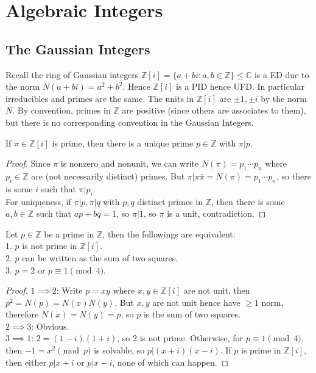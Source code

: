 \section{Algebraic Integers}
\subsection{The Gaussian Integers}
Recall the ring of Gaussian integers $\mathbb Z[i]=\{a+bi:a,b\in\mathbb Z\}\le\mathbb C$ is a ED due to the norm $N(a+bi)=a^2+b^2$.
Hence $\mathbb Z[i]$ is a PID hence UFD.
In particular irreducibles and primes are the same.
The units in $\mathbb Z[i]$ are $\pm 1,\pm i$ by the norm $N$.
By convention, primes in $\mathbb Z$ are positive (since others are associates to them), but there is no corresponding convention in the Gaussian Integers.
\begin{lemma}
    If $\pi\in\mathbb Z[i]$ is prime, then there is a unique prime $p\in\mathbb Z$ with $\pi|p$.
\end{lemma}
\begin{proof}
    Since $\pi$ is nonzero and nonunit, we can write $N(\pi)=p_1\cdots p_n$ where $p_i\in\mathbb Z$ are (not necessarily distinct) primes.
    But $\pi|\pi\bar\pi=N(\pi)=p_1\cdots p_n$, so there is some $i$ such that $\pi|p_i$.\\
    For uniqueness, if $\pi|p,\pi|q$ with $p,q$ distinct primes in $\mathbb Z$, then there is some $a,b\in\mathbb Z$ such that $ap+bq=1$, so $\pi|1$, so $\pi$ is a unit, contradiction.
\end{proof}
\begin{lemma}
    Let $p\in\mathbb Z$ be a prime in $\mathbb Z$, then the followings are equivalent:\\
    1. $p$ is not prime in $\mathbb Z[i]$.\\
    2. $p$ can be written as the sum of two squares.\\
    3. $p=2$ or $p\equiv 1\pmod{4}$.
\end{lemma}
\begin{proof}
    $1\implies 2$: Write $p=xy$ where $x,y\in\mathbb Z[i]$ are not unit, then $p^2=N(p)=N(x)N(y)$.
    But $x,y$ are not unit hence have $\ge 1$ norm, therefore $N(x)=N(y)=p$, so $p$ is the sum of two squares.\\
    $2\implies 3$: Obvious.\\
    $3\implies 1$: $2=(1-i)(1+i)$, so $2$ is not prime.
    Otherwise, for $p\equiv 1\pmod{4}$, then $-1=x^2\pmod{p}$ is solvable, so $p|(x+i)(x-i)$.
    If $p$ is prime in $\mathbb Z[i]$, then either $p|x+i$ or $p|x-i$, none of which can happen.
\end{proof}
